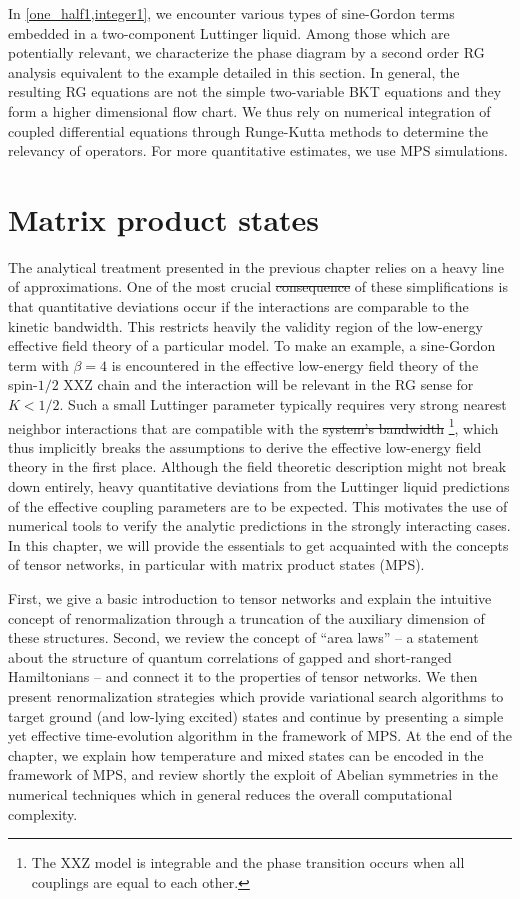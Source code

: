 \documentclass{svmono}
\providecommand{\DIFaddtex}[1]{{\protect\color{blue}\uwave{#1}}} %
\providecommand{\DIFdeltex}[1]{{\protect\color{red}\sout{#1}}}                      %
\providecommand{\DIFaddbegin}{} %
\providecommand{\DIFaddend}{} %
\providecommand{\DIFdelbegin}{} %
\providecommand{\DIFdelend}{} %
\providecommand{\DIFadd}[1]{\texorpdfstring{\DIFaddtex{#1}}{#1}} %
\providecommand{\DIFdel}[1]{\texorpdfstring{\DIFdeltex{#1}}{}} %
\newcommand{\DIFscaledelfig}{0.5}
\newlength{\DIFdelgraphicswidth} %
\newlength{\DIFdelgraphicsheight} %
\newcommand{\DIFaddincludegraphics}[2][]{{\color{blue}\fbox{\DIFOincludegraphics[#1]{#2}}}} %
\newcommand{\DIFdelincludegraphics}[2][]{%
\sbox{\DIFdelgraphicsbox}{\DIFOincludegraphics[#1]{#2}}%
\settoboxwidth{\DIFdelgraphicswidth}{\DIFdelgraphicsbox} %
\settoboxtotalheight{\DIFdelgraphicsheight}{\DIFdelgraphicsbox} %
\scalebox{\DIFscaledelfig}{%
\parbox[b]{\DIFdelgraphicswidth}{\usebox{\DIFdelgraphicsbox}\\[-\baselineskip] \rule{\DIFdelgraphicswidth}{0em}}\llap{\resizebox{\DIFdelgraphicswidth}{\DIFdelgraphicsheight}{%
\setlength{\unitlength}{\DIFdelgraphicswidth}%
\begin{picture}(1,1)%
\thicklines\linethickness{2pt} %
{\color[rgb]{1,0,0}\put(0,0){\framebox(1,1){}}}%
{\color[rgb]{1,0,0}\put(0,0){\line( 1,1){1}}}%
{\color[rgb]{1,0,0}\put(0,1){\line(1,-1){1}}}%
\end{picture}%
}\hspace*{3pt}}} %
} %
\DeclareRobustCommand{\DIFaddbegin}{\DIFOaddbegin \let\includegraphics\DIFaddincludegraphics} %
\DeclareRobustCommand{\DIFaddend}{\DIFOaddend \let\includegraphics\DIFOincludegraphics} %
\DeclareRobustCommand{\DIFdelbegin}{\DIFOdelbegin \let\includegraphics\DIFdelincludegraphics} %
\DeclareRobustCommand{\DIFdelend}{\DIFOaddend \let\includegraphics\DIFOincludegraphics} %
\begin{document}
In \cref{one_half1,integer1}, we encounter various types of sine-Gordon terms embedded in a two-component Luttinger liquid.
Among those which are potentially relevant, we characterize the phase diagram by a second order RG analysis equivalent to the example detailed in this section.
In general, the resulting RG equations are not the simple two-variable BKT equations and they form a higher dimensional flow chart.
We thus rely on numerical integration of coupled differential equations through Runge-Kutta methods to determine the relevancy of operators.
For more quantitative estimates, we use MPS simulations.
\clearpage{}
\clearpage{}\chapter{Matrix product states}
\label{ch:matrix_product_states}
The analytical treatment presented in the previous chapter relies on a heavy line of approximations.
One of the most crucial \DIFdelbegin \DIFdel{consequence }\DIFdelend \DIFaddbegin \DIFadd{consequences }\DIFaddend of these simplifications is that quantitative deviations occur if the interactions are comparable to the kinetic bandwidth.
This restricts heavily the validity region of the low-energy effective field theory of a particular model.
To make an example, a sine-Gordon term with $\beta=4$ is encountered in the effective low-energy field theory of the spin-$1/2$ XXZ chain and the interaction will be relevant in the RG sense for $K<1/2$.
Such a small Luttinger parameter typically requires very strong nearest neighbor interactions that are compatible with the \DIFdelbegin \DIFdel{system's bandwidth }\DIFdelend \DIFaddbegin \DIFadd{bandwidth of the system}\DIFaddend \footnote{The XXZ model is integrable and the phase transition occurs when all couplings are equal to each other.}, which thus implicitly breaks the assumptions to derive the effective low-energy field theory in the first place.
Although the field theoretic description might not break down entirely, heavy quantitative deviations from the Luttinger liquid predictions of the effective coupling parameters are to be expected.
This motivates the use of numerical tools to verify the analytic predictions in the strongly interacting cases.
In this chapter, we will provide the essentials to get acquainted with the concepts of tensor networks, in particular with matrix product states (MPS).

First, we give a basic introduction to tensor networks and explain the intuitive concept of renormalization through a truncation of the auxiliary dimension of these structures.
Second, we review the concept of ``area laws'' -- a statement about the structure of quantum correlations of gapped and short-ranged Hamiltonians -- and connect it to the properties of tensor networks.
We then present renormalization strategies which provide variational search algorithms to target ground (and low-lying excited) states and continue by presenting a simple yet effective time-evolution algorithm in the framework of MPS.
At the end of the chapter, we explain how temperature and mixed states can be encoded in the framework of MPS, and review shortly the exploit of Abelian symmetries in the numerical techniques which in general reduces the overall computational complexity.
\end{document}

